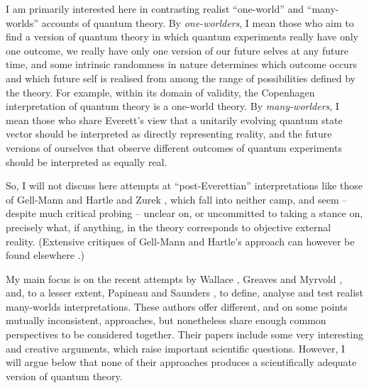\documentclass[aps,
pra,epsfig,12pt]{revtex4}
\begin{document}
I am primarily interested here in contrasting realist ``one-world'' and
``many-worlds'' accounts of quantum theory.  By {\it one-worlders}, I mean
those who aim to find a version of quantum theory in which quantum
experiments really have only one outcome, we really have only one
version of our future selves at any future time, and some intrinsic
randomness in nature determines which outcome occurs and which future
self is realised from among the range of possibilities defined by the
theory.  For example, within its domain of validity, the Copenhagen
interpretation of quantum theory is a one-world theory.  By
{\it many-worlders}, I mean those who share Everett's view that a unitarily
evolving quantum state vector should be interpreted as directly
representing reality, and the future versions of ourselves that
observe different outcomes of quantum experiments should be
interpreted as equally real.

So, I will not discuss here attempts at ``post-Everettian''
interpretations like those of Gell-Mann and Hartle \cite{hartlevol} and
Zurek \cite{zurekvol}, which fall into neither camp, and 
seem -- despite much critical probing -- unclear on, or uncommitted to 
taking a stance on, precisely what, if
anything, in the theory corresponds to objective external reality.
(Extensive critiques of Gell-Mann and Hartle's approach
can however be found 
elsewhere \cite{dowkerkentone, dowkerkenttwo, 
kentone, kenttwo, kentthree, kentfour}.)

My main focus is on the recent attempts by 
Wallace \cite{wallacevolone, wallacevoltwo}, Greaves and 
Myrvold \cite{greavesmyrvoldvol}, and, to a lesser extent, 
Papineau \cite{papineauvol} and Saunders \cite{saundersvol}, 
to define, analyse and test realist many-worlds 
interpretations.  These authors offer
different, and on some points mutually inconsistent, approaches, but
nonetheless share enough common perspectives to be considered
together.  Their papers include some very interesting and creative
arguments, which raise important scientific questions.  However, I
will argue below that none of their approaches produces a
scientifically adequate version of quantum theory.
\end{document}
